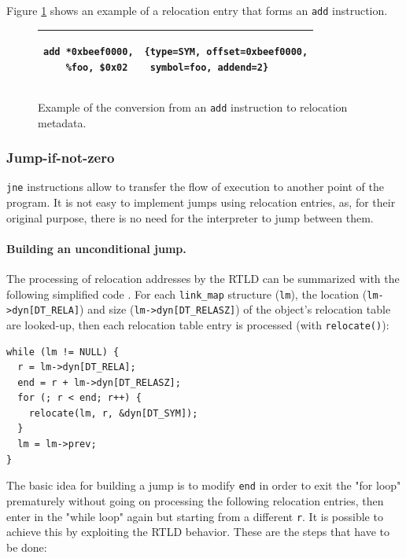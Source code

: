 \documentclass[11pt,twoside,a4paper]{article}
\begin{document}
Figure \ref{add_table} shows an example of a relocation entry that forms an \texttt{add} instruction.

\begin{figure}[ht]
\centering
\begin{tabular}{ l | l }
  \hline
  \begin{lstlisting}
add *0xbeef0000,
    %foo, $0x02
  \end{lstlisting}
  &
  \begin{lstlisting}
{type=SYM, offset=0xbeef0000,
 symbol=foo, addend=2}
  \end{lstlisting} \\
  \hline
\end{tabular}
\caption{Example of the conversion from an \texttt{add} instruction to relocation metadata.}
\label{add_table}
\vspace{-0.4cm}
\end{figure}


\subsubsection{Jump-if-not-zero}
\texttt{jne} instructions allow to transfer the flow of execution to another point of the program. It is not easy to implement jumps using relocation entries, as, for their original purpose, there is no need for the interpreter to jump between them.

\paragraph{Building an unconditional jump.}
The processing of relocation addresses by the RTLD can be summarized with the following simplified code \cite{elf_machine}. For each \texttt{link\_map} structure (\texttt{lm}), the location (\texttt{lm->dyn[DT\_RELA]}) and size (\texttt{lm->dyn[DT\_RELASZ]}) of the object's relocation table are looked-up, then each relocation table entry is processed (with \texttt{relocate()}):
\begin{lstlisting}
while (lm != NULL) {
  r = lm->dyn[DT_RELA];
  end = r + lm->dyn[DT_RELASZ];
  for (; r < end; r++) {
    relocate(lm, r, &dyn[DT_SYM]);
  }
  lm = lm->prev;
}
\end{lstlisting}

The basic idea for building a jump is to modify \texttt{end} in order to exit the "for loop" prematurely without going on processing the following relocation entries, then enter in the "while loop" again but starting from a different \texttt{r}.
It is possible to achieve this by exploiting the RTLD behavior. These are the steps that have to be done:
\end{document}
